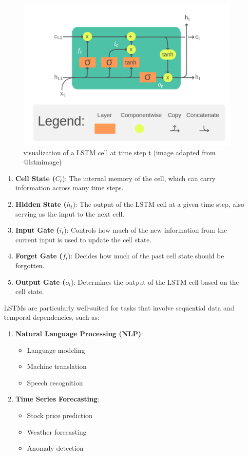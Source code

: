 \documentclass[
]{krantz}
\providecommand{\tightlist}{%
  \setlength{\itemsep}{0pt}\setlength{\parskip}{0pt}}
\begin{document}
\begin{figure}

{\centering \includegraphics[width=0.7\linewidth]{work/07-hydroLSTM/images/LSTM} 

}

\caption{visualization of a LSTM cell at time step t (image adapted from @lstmimage)}\label{fig:lstm}
\end{figure}

\begin{enumerate}
\def\labelenumi{\arabic{enumi}.}
\tightlist
\item
  \textbf{Cell State (}\(C_t\)): The internal memory of the cell, which can carry information across many time steps.
\item
  \textbf{Hidden State (}\(h_t\)): The output of the LSTM cell at a given time step, also serving as the input to the next cell.
\item
  \textbf{Input Gate (}\(i_t\)): Controls how much of the new information from the current input is used to update the cell state.
\item
  \textbf{Forget Gate (}\(f_t\)): Decides how much of the past cell state should be forgotten.
\item
  \textbf{Output Gate (}\(o_t\)): Determines the output of the LSTM cell based on the cell state.
\end{enumerate}

LSTMs are particularly well-suited for tasks that involve sequential data and temporal dependencies, such as:

\begin{enumerate}
\def\labelenumi{\arabic{enumi}.}
\tightlist
\item
  \textbf{Natural Language Processing (NLP)}:

  \begin{itemize}
  \tightlist
  \item
    Language modeling
  \item
    Machine translation
  \item
    Speech recognition
  \end{itemize}
\item
  \textbf{Time Series Forecasting}:

  \begin{itemize}
  \tightlist
  \item
    Stock price prediction
  \item
    Weather forecasting
  \item
    Anomaly detection
  \end{itemize}
\end{enumerate}
\end{document}
